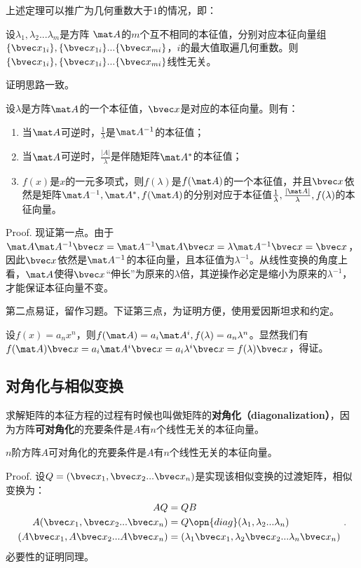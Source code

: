 {上述定理可以推广为几何重数大于$1$的情况，即：
\begin{corollary}{}\label{cor_MatEig_1}
设$\lambda_1,\lambda_2...\lambda_m$是方阵 $\mat A$的$m$个互不相同的本征值，分别对应本征向量组$\{\bvec x_{1i}\},\{\bvec x_{1i}\}...\{\bvec x_{mi}\}$，$i$的最大值取遍几何重数。则$\{\bvec x_{1i}\},\{\bvec x_{1i}\}...\{\bvec x_{mi}\}$线性无关。
\end{corollary}
证明思路一致。


\begin{theorem}{}
设$\lambda$是方阵$\mat A$的一个本征值，$\bvec x$是对应的本征向量。则有：
\begin{enumerate}
\item 当$\mat A$可逆时，$\frac{1}{\lambda }$是$\mat A^{-1}$的本征值；
\item 当$\mat A$可逆时，$\frac{|A|}{\lambda }$是伴随矩阵$\mat A^{*}$的本征值；
\item $f(x)$是$x$的一元多项式，则$f(\lambda)$是$f(\mat A)$的一个本征值，并且$\bvec x$依然是矩阵$\mat A^{-1},\mat A^{*},f(\mat A)$的分别对应于本征值$\frac{1}{\lambda},\frac{|\mat A|}{\lambda},f(\lambda)$的本征向量。
\end{enumerate}
\end{theorem}
Proof.
现证第一点。由于$\mat A\mat A^{-1}\bvec x=\mat A^{-1}\mat A \bvec x=\lambda \mat A^{-1} \bvec x=\bvec x$，因此$\bvec x$依然是$\mat A^{-1}$的本征向量，且本征值为$\lambda^{-1} $。从线性变换的角度上看，$\mat A$使得$\bvec x$“伸长”为原来的$\lambda$倍，其逆操作必定是缩小为原来的$\lambda^{-1}$，才能保证本征向量不变。

第二点易证，留作习题。下证第三点，为证明方便，使用爱因斯坦求和约定。

设$f(x)=a_nx^n$，则$f(\mat A)=a_i\mat A^i,f(\lambda)=a_n\lambda ^n$。显然我们有$f(\mat A)\bvec x=a_i\mat A^i \bvec x=a_i\lambda^i \bvec x=f(\lambda)\bvec x$，得证。

\subsection{对角化与相似变换}

求解矩阵的本征方程的过程有时候也叫做矩阵的\textbf{对角化（diagonalization）}，因为方阵\textbf{可对角化}的充要条件是$A$有$n$个线性无关的本征向量。
\begin{theorem}{}\label{the_MatEig_1}
$n$阶方阵$A$可对角化的充要条件是$A$有$n$个线性无关的本征向量。
\end{theorem}
Proof.
设$Q=(\bvec x_1,\bvec x_2...
\bvec x_n)$是实现该相似变换的过渡矩阵，相似变换为：
\begin{equation}
\begin{aligned}
AQ&=QB\\
A(\bvec x_1,\bvec x_2...
\bvec x_n)&=Q\opn{diag}(\lambda_1,\lambda_2...\lambda_n)\\
(A\bvec x_1,A\bvec x_2...
A\bvec x_n)&=(\lambda_1 \bvec x_1,\lambda_2\bvec x_2...\lambda_n\bvec x_n)\\
\end{aligned}~.
\end{equation}
必要性的证明同理。

}
